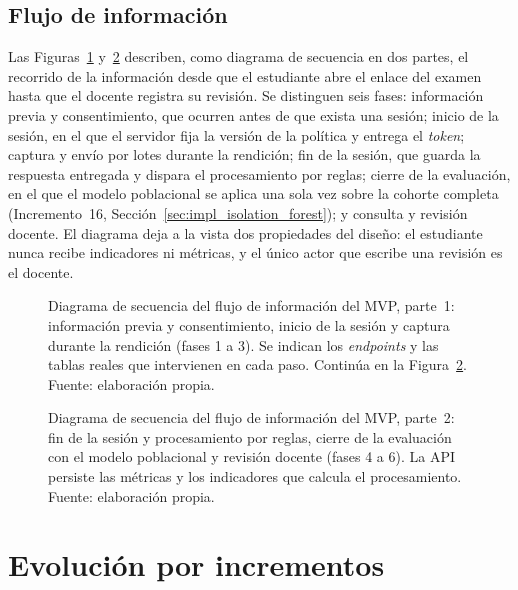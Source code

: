 \subsection{Flujo de información}
\label{sec:impl_flujo}

Las Figuras~\ref{fig:diag_flujo} y~\ref{fig:diag_flujo_b} describen, como diagrama de secuencia en dos partes, el recorrido de la información desde que el estudiante abre el enlace del examen hasta que el docente registra su revisión. Se distinguen seis fases: información previa y consentimiento, que ocurren antes de que exista una sesión; inicio de la sesión, en el que el servidor fija la versión de la política y entrega el \textit{token}; captura y envío por lotes durante la rendición; fin de la sesión, que guarda la respuesta entregada y dispara el procesamiento por reglas; cierre de la evaluación, en el que el modelo poblacional se aplica una sola vez sobre la cohorte completa (Incremento~16, Sección~\ref{sec:impl_isolation_forest}); y consulta y revisión docente. El diagrama deja a la vista dos propiedades del diseño: el estudiante nunca recibe indicadores ni métricas, y el único actor que escribe una revisión es el docente.

\begin{figure}[tp]
    \centering
    
    \caption[Diagrama de secuencia del flujo de información del MVP, parte~1]{Diagrama de secuencia del flujo de información del MVP, parte~1: información previa y consentimiento, inicio de la sesión y captura durante la rendición (fases 1 a 3). Se indican los \textit{endpoints} y las tablas reales que intervienen en cada paso. Continúa en la Figura~\ref{fig:diag_flujo_b}. Fuente: elaboración propia.}
    \label{fig:diag_flujo}
\end{figure}

\begin{figure}[p]
    \centering
    
    \caption[Diagrama de secuencia del flujo de información del MVP, parte~2]{Diagrama de secuencia del flujo de información del MVP, parte~2: fin de la sesión y procesamiento por reglas, cierre de la evaluación con el modelo poblacional y revisión docente (fases 4 a 6). La API persiste las métricas y los indicadores que calcula el procesamiento. Fuente: elaboración propia.}
    \label{fig:diag_flujo_b}
\end{figure}

\section{Evolución por incrementos}
\label{sec:impl_incrementos}

